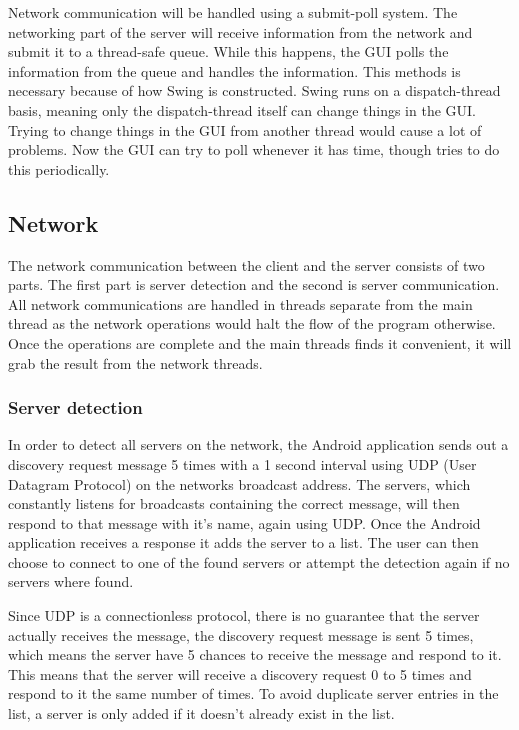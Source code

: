 \documentclass[12pt,a4paper,notitlepage]{report}
\begin{document}
Network communication will be handled using a submit-poll system. The networking part of the server will receive information from the network and submit it to a thread-safe queue. While this happens, the GUI polls the information from the queue and handles the information. This methods is necessary because of how Swing is constructed. Swing runs on a dispatch-thread basis, meaning only the dispatch-thread itself can change things in the GUI. Trying to change things in the GUI from another thread would cause a lot of problems. Now the GUI can try to poll whenever it has time, though tries to do this periodically.  

\subsection{Network}
The network communication between the client and the server consists of two parts. The first part is server detection and the second is server communication. All network communications are handled in threads separate from the main thread as the network operations would halt the flow of the program otherwise. Once the operations are complete and the main threads finds it convenient, it will grab the result from the network threads.

\subsubsection{Server detection}
In order to detect all servers on the network, the Android application sends out a discovery request message 5 times with a 1 second interval using UDP (User Datagram Protocol) on the networks broadcast address. The servers, which constantly listens for broadcasts containing the correct message, will then respond to that message with it's name, again using UDP. Once the Android application receives a response it adds the server to a list. The user can then choose to connect to one of the found servers or attempt the detection again if no servers where found.

Since UDP is a connectionless protocol, there is no guarantee that the server actually receives the message, the discovery request message is sent 5 times, which means the server have 5 chances to receive the message and respond to it. This means that the server will receive a discovery request 0 to 5 times and respond to it the same number of times. To avoid duplicate server entries in the list, a server is only added if it doesn't already exist in the list.
\end{document}
